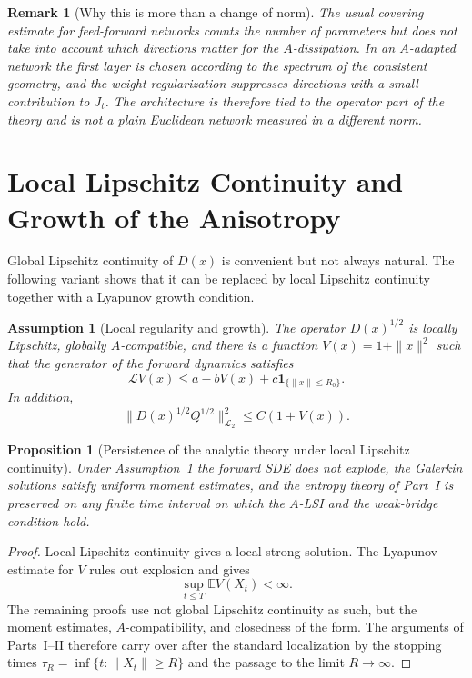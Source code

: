 \documentclass{article}
\newtheorem{proposition}[theorem]{Proposition}
\newtheorem{assumption}[theorem]{Assumption}
\newtheorem{remark}[theorem]{Remark}
\newcommand{\LLtwo}{\mathcal L_2}
\newcommand{\E}{\mathbb E}
\begin{document}
\begin{remark}[Why this is more than a change of norm]
The usual covering estimate for feed-forward networks counts the number of
parameters but does not take into account which directions matter for the
\(A\)-dissipation. In an \(A\)-adapted network the first layer is chosen according
to the spectrum of the consistent geometry, and the weight regularization
suppresses directions with a small contribution to \(J_t\). The architecture is
therefore tied to the operator part of the theory and is not a plain Euclidean
network measured in a different norm.
\end{remark}

\section{Local Lipschitz Continuity and Growth of the Anisotropy}
\label{sec:local-lipschitz}

Global Lipschitz continuity of \(D(x)\) is convenient but not always natural. The
following variant shows that it can be replaced by local Lipschitz continuity
together with a Lyapunov growth condition.

\begin{assumption}[Local regularity and growth]
\label{ass:local-growth-D}
The operator \(D(x)^{1/2}\) is locally Lipschitz, globally \(A\)-compatible, and
there is a function \(V(x)=1+\|x\|^2\) such that the generator of the forward
dynamics satisfies
\[
        \mathcal LV(x)\le a-bV(x)+c\mathbf 1_{\{\|x\|\le R_0\}} .
\]
In addition,
\[
        \|D(x)^{1/2}Q^{1/2}\|_{\LLtwo}^2
        \le C(1+V(x)).
\]
\end{assumption}

\begin{proposition}[Persistence of the analytic theory under local Lipschitz continuity]
\label{prop:local-lipschitz-extension}
Under Assumption~\ref{ass:local-growth-D} the forward SDE does not explode, the
Galerkin solutions satisfy uniform moment estimates, and the entropy theory of
Part~I is preserved on any finite time interval on which the \(A\)-LSI and the
weak-bridge condition hold.
\end{proposition}

\begin{proof}
Local Lipschitz continuity gives a local strong solution. The Lyapunov estimate
for \(V\) rules out explosion and gives
\[
        \sup_{t\le T}\E V(X_t)<\infty .
\]
The remaining proofs use not global Lipschitz continuity as such, but the moment
estimates, \(A\)-compatibility, and closedness of the form. The arguments of
Parts~I--II therefore carry over after the standard localization by the stopping
times \(\tau_R=\inf\{t:\|X_t\|\ge R\}\) and the passage to the limit
\(R\to\infty\).
\end{proof}
\end{document}
